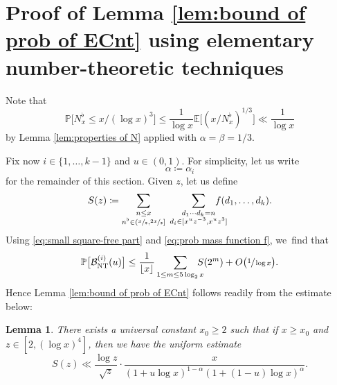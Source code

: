 \documentclass[JEP,XML,SOM,Unicode,published]{cedram}
\newcommand{\PP}{\mathbb{P}}
\newcommand{\EE}{\mathbb{E}}
\newcommand{\floor}[1]{\left\lfloor #1 \right\rfloor}
\newcommand{\bg}{\big}
\newcommand{\Bnt}{\mathcal{B}_{\mathrm{NT}}}
\theoremstyle{plain}
\newtheorem{lem}[cor]{Lemma}
\theoremstyle{definition}
\begin{document}
\section{Proof of Lemma \ref{lem:bound of prob of ECnt} using elementary number-theoretic techniques}\label{sec:boundary event NT}

Note that
\begin{equation}
\label{eq:small square-free part}
\PP\bg[N_x^\flat\le x/(\log x)^3\bg] \le \frac{1}{\log x} \EE\bg[(x/N_x^\flat)^{1/3}\bg] \ll \frac{1}{\log x}
\end{equation}
by Lemma \ref{lem:properties of N} applied with $\alpha=\beta=1/3$.

Fix now $i\in\{1,\dots,k-1\}$ and $u\in(0,1)$. For simplicity, let us write
\[
\alpha\coloneqq \alpha_i
\]
for the remainder of this section. Given $z$, let us define
\[
S(z)\coloneqq \sum_{\substack{n\le x \\ n^\flat \in(\sfrac{x}{z},\sfrac{2x}{z}]}}\; \sum_{\substack{d_1\cdots d_k = n \\ d_i\in[x^uz^{-3}, x^uz^3] }}\hspace*{-5mm} f(d_1,\dots,d_k).
\]
Using \eqref{eq:small square-free part} and \eqref{eq:prob mass function f}, we~find that
\begin{equation}
\label{eq:bounding Bnt 1}
\PP\bg[\Bnt^{(i)}(u)\bg] \le \frac{1}{\floor{x}} \sum_{1\le m\le 5\log_2x}\hspace*{-3mm} S(2^m) + O\bg(\sfrac{1}{\log x}\bg).
\end{equation}
Hence Lemma \ref{lem:bound of prob of ECnt} follows readily from the estimate below:

\begin{lem}
There exists a universal constant $x_0\ge2$ such that if $x\ge x_0$ and $z\in[2,(\log x)^4]$, then we have the uniform estimate
\[
S(z) \ll \frac{\log z}{\sqrt{z}} \cdot \frac{x}{(1+ u\log x)^{1-\alpha}(1+(1-u)\log x)^{\alpha}}.
\]
\end{lem}
\end{document}
